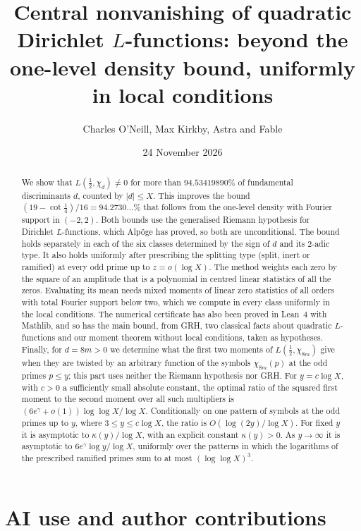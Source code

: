 \documentclass[11pt,colorlinks]{charlie}
\title{Central nonvanishing of quadratic Dirichlet $L$-functions: beyond the one-level density bound, uniformly in local conditions}
\author{Charles O'Neill, Max Kirkby, Astra and Fable}
\date{24 November 2026}
\begin{document}
\maketitle

\begin{abstract}
We show that $L(\tfrac12,\chi_d)\neq0$ for more than $94.53419890\%$ of fundamental discriminants $d$, counted by $|d|\le X$. This improves the bound $(19-\cot\tfrac14)/16=94.2730\ldots\%$ that follows from the one-level density with Fourier support in $(-2,2)$. Both bounds use the generalised Riemann hypothesis for Dirichlet $L$-functions, which Alp\"oge has proved, so both are unconditional. The bound holds separately in each of the six classes determined by the sign of $d$ and its $2$-adic type. It also holds uniformly after prescribing the splitting type (split, inert or ramified) at every odd prime up to $z=o(\log X)$. The method weights each zero by the square of an amplitude that is a polynomial in centred linear statistics of all the zeros. Evaluating its mean needs mixed moments of linear zero statistics of all orders with total Fourier support below two, which we compute in every class uniformly in the local conditions. The numerical certificate has also been proved in Lean~4 with Mathlib, and so has the main bound, from GRH, two classical facts about quadratic $L$-functions and our moment theorem without local conditions, taken as hypotheses. Finally, for $d=8m>0$ we determine what the first two moments of $L(\tfrac12,\chi_{8m})$ give when they are twisted by an arbitrary function of the symbols $\chi_{8m}(p)$ at the odd primes $p\le y$; this part uses neither the Riemann hypothesis nor GRH. For $y=c\log X$, with $c>0$ a sufficiently small absolute constant, the optimal ratio of the squared first moment to the second moment over all such multipliers is $(6e^\gamma+o(1))\log\log X/\log X$. Conditionally on one pattern of symbols at the odd primes up to $y$, where $3\le y\le c\log X$, the ratio is $O(\log(2y)/\log X)$. For fixed $y$ it is asymptotic to $\kappa(y)/\log X$, with an explicit constant $\kappa(y)>0$. As $y\to\infty$ it is asymptotic to $6e^\gamma\log y/\log X$, uniformly over the patterns in which the logarithms of the prescribed ramified primes sum to at most $(\log\log X)^3$.
\end{abstract}

\section*{AI use and author contributions}
\aiusestatement
\end{document}
